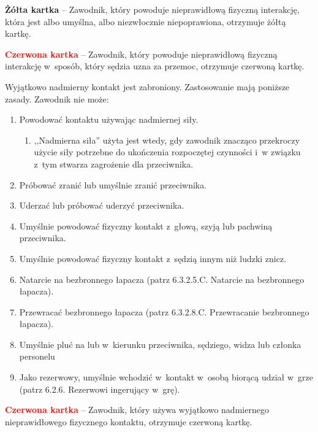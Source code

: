 \documentclass[12pt,a4paper]{article}
\renewcommand{\paragraph}[1]{
  \oldparagraph{#1}%
  \leftskip2.8cm
}
\newcommand\redcard[1]{\bgroup\textcolor{red}{\textbf{#1}}}
\newcommand\yellowcard[1]{\bgroup\textcolor{darkyellow}{\textbf{#1}}}
\begin{document}
\yellowcard{Żółta kartka} -- Zawodnik, który powoduje nieprawidłową fizyczną
interakcję, która jest albo umyślna, albo niezwłocznie niepoprawiona,
otrzymuje żółtą kartkę.

\redcard{Czerwona kartka} -- Zawodnik, który powoduje nieprawidłową fizyczną
interakcję w~sposób, który sędzia uzna za przemoc, otrzymuje czerwoną
kartkę.

\paragraph{Wyjątkowo nadmierny kontakt}
Wyjątkowo nadmierny
kontakt jest zabroniony. Zastosowanie mają poniższe zasady. Zawodnik nie
może:

\begin{enumerate}
	\item
	      Powodować kontaktu używając nadmiernej siły.

	      \begin{enumerate}
		      \item
		            ,,Nadmierna siła'' użyta jest wtedy, gdy zawodnik znacząco
		            przekroczy użycie siły potrzebne do ukończenia rozpoczętej czynności
		            i~w związku z~tym stwarza zagrożenie dla przeciwnika.
	      \end{enumerate}
	\item
	      Próbować zranić lub umyślnie zranić przeciwnika.
	\item
	      Uderzać lub próbować uderzyć przeciwnika.
	\item
	      Umyślnie powodować fizyczny kontakt z~głową, szyją lub pachwiną
	      przeciwnika.
	\item
	      Umyślnie powodować fizyczny kontakt z~sędzią innym niż ludzki znicz.
	\item
	      Natarcie na bezbronnego łapacza (patrz 6.3.2.5.C. Natarcie na
	      bezbronnego łapacza).
	\item
	      Przewracać bezbronnego łapacza (patrz 6.3.2.8.C. Przewracanie
	      bezbronnego łapacza).
	\item
	      Umyślnie pluć na lub w~kierunku przeciwnika, sędziego, widza lub
	      członka personelu
	\item
	      Jako rezerwowy, umyślnie wchodzić w~kontakt w~osobą biorącą udział w~grze (patrz 6.2.6. Rezerwowi ingerujący w~grę).
\end{enumerate}

\redcard{Czerwona kartka} -- Zawodnik, który używa wyjątkowo nadmiernego
nieprawidłowego fizycznego kontaktu, otrzymuje czerwoną kartkę.
\end{document}

